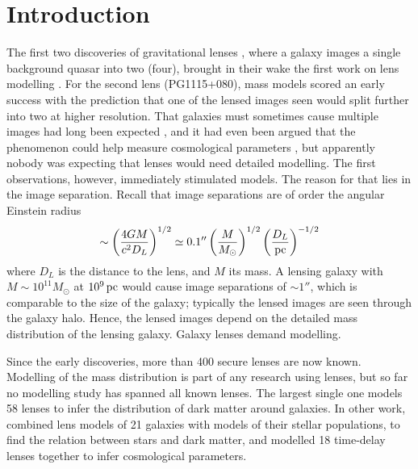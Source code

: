 \documentclass[usenatbib]{mn2e}
\begin{document}
\begin{keywords}
\end{keywords}


\section{Introduction}

The first two discoveries of gravitational lenses
\citep{1979Natur.279..381W,1980Natur.285..641W}, where a galaxy images
a single background quasar into two (four), brought in their wake the
first
work on lens modelling
\citep{1981ApJ...244..723Y,1981ApJ...244..736Y}.  For the second lens
(PG1115+080), mass models scored an early success with the prediction
that one of the lensed images seen would split further into two at
higher resolution.  That galaxies must sometimes cause multiple images
had long been expected \citep{1937ApJ....86..217Z}, and it had even
been argued that the phenomenon could help measure cosmological
parameters \citep{1964MNRAS.128..307R,1966MNRAS.132..101R}, but
apparently nobody was expecting that lenses would need detailed
modelling.  The first observations, however, immediately stimulated
models.  The reason for that lies in the image separation. Recall that
image separations are of order the angular Einstein radius
\begin{equation}
\sim \left(\frac{4GM}{c^2 D_L}\right)^{1/2}
\simeq 0.1'' \left(\frac{M}{M_\odot}\right)^{1/2}
             \left(\frac{D_L}{\rm pc}\right)^{-1/2}
\end{equation}
where $D_L$ is the distance to the lens, and $M$ its mass.  A lensing
galaxy with $M\sim10^{11}M_\odot$ at $10^9\rm\,pc$ would cause image
separations of $\sim1''$, which is comparable to the size of the
galaxy; typically the lensed images are seen through the galaxy halo.
Hence, the lensed images depend on the detailed mass distribution of
the lensing galaxy.  Galaxy lenses demand modelling.

Since the early discoveries, more than 400 secure lenses are now
known. Modelling of the mass distribution is part of any research
using lenses, but so far no modelling study has spanned all known
lenses.  The largest single one \citep{2009ApJ...703L..51K} models 58
lenses to infer the distribution of dark matter around galaxies.  In
other work, \cite{2011ApJ...740...97L} combined lens models of 21
galaxies with models of their stellar populations, to find the
relation between stars and dark matter, and \cite{2014MNRAS.437..600S}
modelled 18 time-delay lenses together to infer cosmological
parameters.
\end{document}
